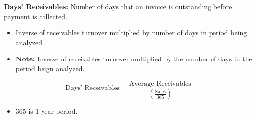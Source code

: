 \begin{definition}
    \textbf{Days' Receivables:} Number of days that an invoice is outstanding before payment is collected.
    \begin{itemize}
        \item Inverse of receivables turnover multiplied by number of days in period being analyzed.
    \end{itemize}
    \begin{itemize}
        \item \textbf{Note:} Inverse of receivables turnover multiplied by the number of days in the period beign analyzed.
    \end{itemize}

    \begin{equation}
        \text{Days' Receivables} = \frac{\text{Average Receivables}}{\left(\frac{\text{Sales}}{365}\right)}
    \end{equation}

    \begin{itemize}
        \item 365 is 1 year period.
    \end{itemize}
\end{definition}


